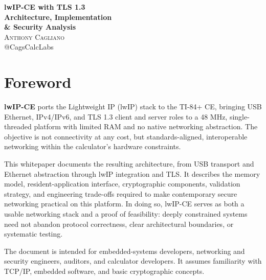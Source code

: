 \documentclass[titlepage]{report}
\renewcommand{\baselinestretch}{1.2} %
\begin{document}
	
	\begin{titlepage}
		\begin{center}
			\vspace*{1in}
			{\Large\textbf{lwIP-CE with TLS 1.3}}\\
			\vspace*{0.5in}
			{\LARGE\textbf{Architecture, Implementation\\[0.25in]\& Security Analysis}}\\
			\vspace*{1in}
			{\large\textsc{Anthony Cagliano}}\\[0.1in]
			{\small @CagsCalcLabs}
		\end{center}
	\end{titlepage}
	\setcounter{secnumdepth}{2}
	\setcounter{tocdepth}{2}
	\begingroup
	\renewcommand{\baselinestretch}{0.92}\selectfont
	\setlength{\parskip}{0pt}
	\tableofcontents
	\endgroup

	\newpage
	\section{Foreword}

	\textbf{lwIP-CE} ports the Lightweight IP (lwIP) stack to the TI-84+ CE, bringing USB Ethernet, IPv4/IPv6, and TLS 1.3 client and server roles to a 48 MHz, single-threaded platform with limited RAM and no native networking abstraction. The objective is not connectivity at any cost, but standards-aligned, interoperable networking within the calculator's hardware constraints.

	This whitepaper documents the resulting architecture, from USB transport and Ethernet abstraction through lwIP integration and TLS. It describes the memory model, resident-application interface, cryptographic components, validation strategy, and engineering trade-offs required to make contemporary secure networking practical on this platform. In doing so, lwIP-CE serves as both a usable networking stack and a proof of feasibility: deeply constrained systems need not abandon protocol correctness, clear architectural boundaries, or systematic testing.

	The document is intended for embedded-systems developers, networking and security engineers, auditors, and calculator developers. It assumes familiarity with TCP/IP, embedded software, and basic cryptographic concepts.
\end{document}
